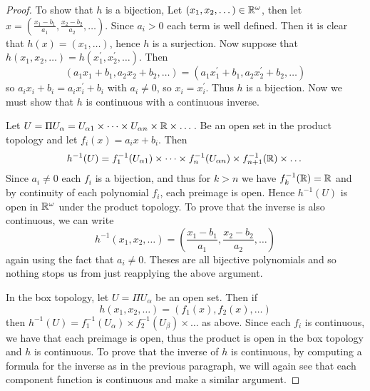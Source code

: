     \question 

    \begin{proof}
        To show that $h$ is a bijection, Let $(x_1, x_2, \dots) \in \mathbb{R}^\omega$, then let $x = (\frac{x_1 - b_1}{a_1}, \frac{x_2-b_2}{a_2}, \dots)$. Since $a_i > 0$ each term is well defined. Then it is clear that $h(x) = (x_1, \dots)$, hence 
        $h$ is a surjection. Now suppose that $h(x_1, x_2, \dots) = h(x_1^\prime, x_2^\prime, \dots)$. Then 
        \[(a_1x_1 + b_1, a_2x_2 + b_2, \dots) = (a_1x_1^\prime + b_1, a_2x_2^\prime + b_2, \dots)\]
        so $a_ix_i + b_i = a_ix_i^\prime + b_i$ with $a_i \neq 0$, so $x_i = x_i^\prime$. Thus $h$ is a bijection. 
        Now we must show that $h$ is continuous with a continuous inverse. 
        
        Let $U = \Pi U_\alpha = U_{\alpha 1} \times \dots \times  U_{\alpha n} \times \mathbb{R} \times \dots$. Be an open set in 
        the product topology and let $f_i(x) = a_i x + b_i$. Then 
        \[h^{-1}(U) = f^{-1}_1(U_{\alpha 1}) \times \dots \times f^{-1}_n(U_{\alpha n}) \times f^{-1}_{n+1}(\mathbb{R}) \times \dots\]
        Since $a_i \neq 0$ each $f_i$ is a bijection, and thus for $k > n$ we have $f^{-1}_k(\mathbb{R}) = \mathbb{R}$ and 
        by continuity of each polynomial $f_i$, each preimage is open. Hence $h^{-1}(U)$ is open in $\mathbb{R}^\omega$ under the product topology. 
        To prove that the inverse is also continuous, we can write 
        \[h^{-1}(x_1, x_2, \dots) = \left(\frac{x_1 - b_1}{a_1}, \frac{x_2 - b_2}{a_2}, \dots \right)\]
        again using the fact that $a_i \neq 0$. Theses are all bijective polynomials and so nothing stops us from just 
        reapplying the above argument. 


        In the box topology, let $U = \Pi U_\alpha$ be an open set. Then if 
        \[h(x_1, x_2, \dots ) = (f_1(x), f_2(x), \dots )\]
        then $h^{-1}(U) = f^{-1}_1(U_\alpha) \times f_2^{-1}(U_\beta) \times \dots $ as above.
        Since each $f_i$ is continuous, we have that each preimage is open, thus the product is open in the box topology 
        and $h$ is continuous. To prove that the inverse of $h$ is continuous, by computing a formula for the inverse 
        as in the previous paragraph, we will again see that each component function is continuous and make a similar argument. 
    \end{proof}

    

   

